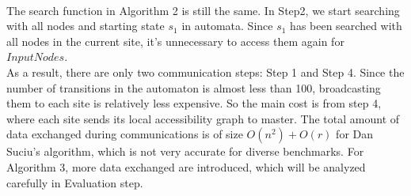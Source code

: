 \\The search function in Algorithm 2 is still the same. In Step2, we start searching with all nodes and starting state $s_1$ in automata. Since $s_1$ has been searched with all nodes in the current site, it's unnecessary to access them again for $InputNodes$.
\\As a result, there are only two communication steps: Step 1 and Step 4. Since the number of transitions in the automaton  is almost less than 100, broadcasting them to each site is relatively less expensive. So the main cost is from step 4, where each site sends its local accessibility graph to master. The total amount of data exchanged during communications is of size $O(n^2)+O(r)$ for Dan Suciu's algorithm, which is not very accurate for diverse benchmarks. For Algorithm 3, more data exchanged are introduced, which will be analyzed carefully in Evaluation step.
